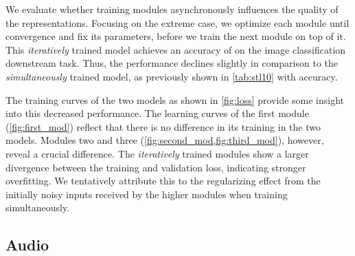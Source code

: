 \documentclass{article}
\begin{document}
We evaluate whether training modules asynchronously influences the quality of the representations. Focusing on the extreme case, we optimize each module until convergence and fix its parameters, before we train the next module on top of it. This \textit{iteratively} trained model achieves an accuracy of  on the image classification downstream task. Thus, the performance declines slightly in comparison to the \textit{simultaneously} trained model, as previously shown in \cref{tab:stl10} with  accuracy. 

The training curves of the two models as shown in \cref{fig:loss} provide some insight into this decreased performance. The learning curves of the first module (\cref{fig:first_mod}) reflect that there is no difference in its training in the two models. Modules two and three (\cref{fig:second_mod,fig:third_mod}), however, reveal a crucial difference. The \textit{iteratively} trained modules show a larger divergence between the training and validation loss, indicating stronger overfitting. We tentatively attribute this to the regularizing effect from the initially noisy inputs received by the higher modules when training simultaneously. 




\subsection{Audio} 
\label{sec:InfoMaxResults}
\end{document}
